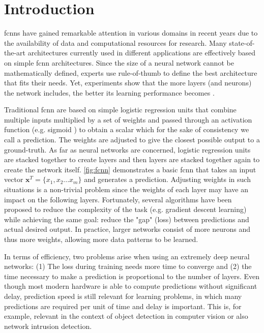 \documentclass[conference]{IEEEtran}
\begin{document}
\section{Introduction}
\glspl{fcnn} have gained remarkable attention in various domains in recent years due to the availability of data and computational resources for research. Many state-of-the-art architectures currently used in different applications are effectively based on simple \gls{fcnn} architectures. Since the size of a neural network cannot be mathematically defined, experts use rule-of-thumb to define the best architecture that fits their needs. Yet, experiments show that the more layers (and neurons) the network includes, the better its learning performance becomes \cite{eldan_power_2016}.

Traditional \gls{fcnn} are based on simple logistic regression units that combine multiple inputs multiplied by a set of weights and passed through an activation function (e.g. sigmoid \cite{noauthor_sigmoid_2020}) to obtain a scalar which for the sake of consistency we call a prediction. The weights are adjusted to give the closest possible output to a ground-truth. As far as neural networks are concerned, logistic regression units are stacked together to create layers and then layers are stacked together again to create the network itself. \autoref{fig:fcnn} demonstrates a basic \gls{fcnn} that takes an input vector $\textbf{x}^{T} = \lbrace x_{1}, x_{2} ... x_{m} \rbrace$ and generates a prediction. Adjusting weights in such situations is a non-trivial problem since the weights of each layer may have an impact on the following layers. Fortunately, several algorithms have been proposed to reduce the complexity of the task (e.g. gradient descent learning) while achieving the same goal: reduce the "gap" (loss) between predictions and actual desired output. In practice, larger networks consist of more neurons and thus more weights, allowing more data patterns to be learned.

In terms of efficiency, two problems arise when using an extremely deep neural networks: (1) The loss during training needs more time to converge and (2) the time necessary to make a prediction is proportional to the number of layers. Even though most modern hardware is able to compute predictions without significant delay, prediction speed is still relevant for learning problems, in which many predictions are required per unit of time and delay is important. This is, for example, relevant in the context of object detection in computer vision or also network intrusion detection. 
\end{document}
